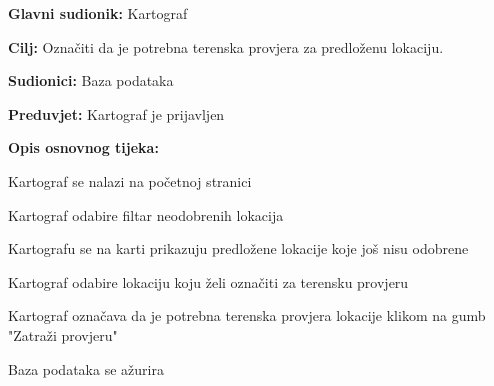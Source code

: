 					\noindent {}
					\begin{packed_item}
	
						\item \textbf{Glavni sudionik: }Kartograf
						\item  \textbf{Cilj:} Označiti da je potrebna terenska provjera za predloženu lokaciju.
						\item  \textbf{Sudionici:} Baza podataka
						\item  \textbf{Preduvjet:} Kartograf je prijavljen
						\item  \textbf{Opis osnovnog tijeka:}
						
						\item[] \begin{packed_enum}
	
							\item Kartograf se nalazi na početnoj stranici
							\item Kartograf odabire filtar neodobrenih lokacija
							\item Kartografu se na karti prikazuju predložene lokacije koje još nisu odobrene
							\item Kartograf odabire lokaciju koju želi označiti za terensku provjeru
							\item Kartograf označava da je potrebna terenska provjera lokacije klikom na gumb "Zatraži provjeru"
							\item Baza podataka se ažurira

						\end{packed_enum}
						
					\end{packed_item}
					

